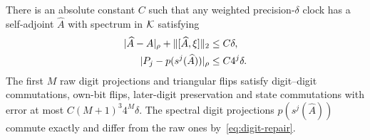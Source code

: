 \begin{lemma}\label{lem:clock-repair}
There is an absolute constant $C$ such that any weighted precision-$\delta$ clock has a self-adjoint $\widehat A$ with spectrum in $\mathcal K$ satisfying
\begin{align}
 |\widehat A-A|_\rho+\lVert[\widehat A,\xi]\rVert_2&\le C\delta,\label{eq:linear-repair}\\
 |P_j-p(s^j(\widehat A))|_\rho&\le C4^j\delta.\label{eq:digit-repair}
\end{align}
The first $M$ raw digit projections and triangular flips satisfy digit--digit commutations, own-bit flips, later-digit preservation and state commutations with error at most $C(M+1)^3 4^M\delta$. The spectral digit projections $p(s^j(\widehat A))$ commute exactly and differ from the raw ones by~\eqref{eq:digit-repair}.
\end{lemma}
